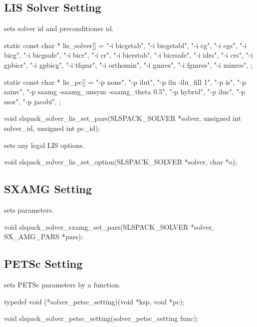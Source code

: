 \subsection{LIS Solver Setting}
 sets solver id and preconditioner id.
\begin{evb}
static const char * lis_solver[] = {
    "-i bicgstab",
    "-i bicgstabl",
    "-i cg",
    "-i cgs",
    "-i bicg",
    "-i bicgsafe",
    "-i bicr",
    "-i cr",
    "-i bicrstab",
    "-i bicrsafe",
    "-i idrs",
    "-i crs",
    "-i gpbicr",
    "-i gpbicg",
    "-i tfqmr",
    "-i orthomin",
    "-i gmres",
    "-i fgmres",
    "-i minres",
};

static const char * lis_pc[] = {
    "-p none",
    "-p ilut",
    "-p ilu -ilu_fill 1",
    "-p is",
    "-p sainv",
    "-p saamg -saamg_unsym -saamg_theta 0.5",
    "-p hybrid",
    "-p iluc",
    "-p ssor",
    "-p jacobi",
};

void slspack_solver_lis_set_pars(SLSPACK_SOLVER *solver, unsigned int solver_id,
    unsigned int pc_id);
\end{evb}

 sets any legal LIS options.
\begin{evb}
void slspack_solver_lis_set_option(SLSPACK_SOLVER *solver, char *o);
\end{evb}

\subsection{SXAMG Setting}
 sets parameters.
\begin{evb}
void slspack_solver_sxamg_set_pars(SLSPACK_SOLVER *solver, SX_AMG_PARS *pars);
\end{evb}

\subsection{PETSc Setting}
 sets PETSc parameters by a function.
\begin{evb}
typedef void (*solver_petsc_setting)(void *ksp, void *pc);

void slspack_solver_petsc_setting(solver_petsc_setting func);
\end{evb}
